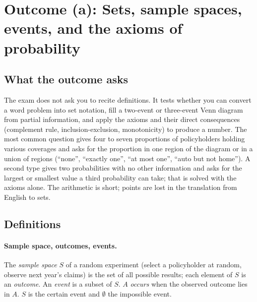 \section{Outcome (a): Sets, sample spaces, events, and the axioms of probability}

\subsection{What the outcome asks}

The exam does not ask you to recite definitions. It tests whether you can convert
a word problem into set notation, fill a two-event or three-event Venn diagram from
partial information, and apply the axioms and their direct consequences (complement
rule, inclusion-exclusion, monotonicity) to produce a number. The most common
question gives four to seven proportions of policyholders holding various coverages
and asks for the proportion in one region of the diagram or in a union of regions
(``none'', ``exactly one'', ``at most one'', ``auto but not home''). A second type
gives two probabilities with no other information and asks for the largest or
smallest value a third probability can take; that is solved with the axioms alone.
The arithmetic is short; points are lost in the translation from English to sets.

\subsection{Definitions}

\paragraph{Sample space, outcomes, events.}
The \emph{sample space} $S$ of a random experiment (select a policyholder at
random, observe next year's claims) is the set of all possible results; each element of $S$ is
an \emph{outcome}. An \emph{event} is a subset of $S$. $A$ \emph{occurs} when the observed outcome lies in $A$. $S$ is the certain
event and $\emptyset$ the impossible event.

